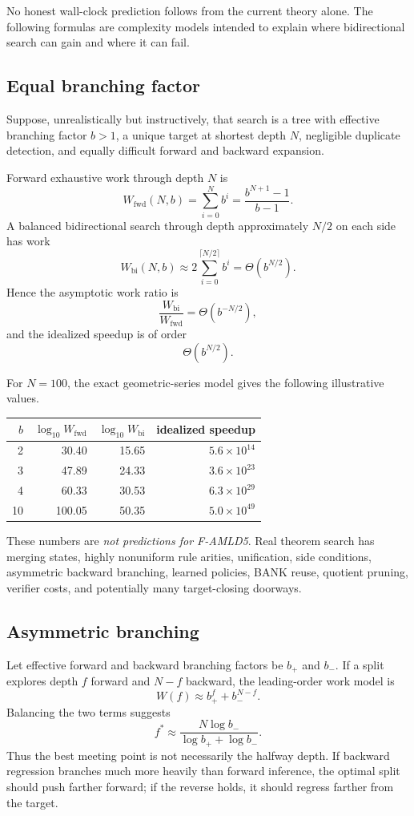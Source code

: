 \documentclass[11pt]{article}
\begin{document}
No honest wall-clock prediction follows from the current theory alone. The following formulas are complexity models intended to explain where bidirectional search can gain and where it can fail.

\subsection{Equal branching factor}
Suppose, unrealistically but instructively, that search is a tree with effective branching factor $b>1$, a unique target at shortest depth $N$, negligible duplicate detection, and equally difficult forward and backward expansion.

Forward exhaustive work through depth $N$ is
\[
W_{\mathrm{fwd}}(N,b)=\sum_{i=0}^{N}b^i
=\frac{b^{N+1}-1}{b-1}.
\]
A balanced bidirectional search through depth approximately $N/2$ on each side has work
\[
W_{\mathrm{bi}}(N,b)
\approx
2\sum_{i=0}^{\lceil N/2\rceil}b^i
=
\Theta(b^{N/2}).
\]
Hence the asymptotic work ratio is
\[
\frac{W_{\mathrm{bi}}}{W_{\mathrm{fwd}}}
=\Theta(b^{-N/2}),
\]
and the idealized speedup is of order
\[
\Theta(b^{N/2}).
\]

For $N=100$, the exact geometric-series model gives the following illustrative values.

\begin{center}
\begin{tabular}{@{}rrrr@{}}
\toprule
$b$ & $\log_{10}W_{\mathrm{fwd}}$ & $\log_{10}W_{\mathrm{bi}}$ & idealized speedup \\
\midrule
2 & 30.40 & 15.65 & $5.6\times10^{14}$ \\
3 & 47.89 & 24.33 & $3.6\times10^{23}$ \\
4 & 60.33 & 30.53 & $6.3\times10^{29}$ \\
10 & 100.05 & 50.35 & $5.0\times10^{49}$ \\
\bottomrule
\end{tabular}
\end{center}

These numbers are \emph{not predictions for F-AMLD5}. Real theorem search has merging states, highly nonuniform rule arities, unification, side conditions, asymmetric backward branching, learned policies, BANK reuse, quotient pruning, verifier costs, and potentially many target-closing doorways.

\subsection{Asymmetric branching}
Let effective forward and backward branching factors be $b_+$ and $b_-$. If a split explores depth $f$ forward and $N-f$ backward, the leading-order work model is
\[
W(f)\approx b_+^f+b_-^{N-f}.
\]
Balancing the two terms suggests
\[
f^*\approx
\frac{N\log b_-}{\log b_+ + \log b_-}.
\]
Thus the best meeting point is not necessarily the halfway depth. If backward regression branches much more heavily than forward inference, the optimal split should push farther forward; if the reverse holds, it should regress farther from the target.
\end{document}
